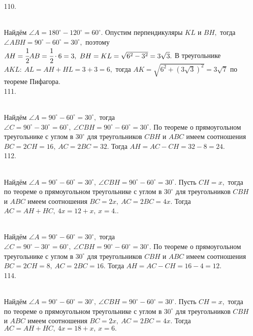 110. \begin{figure}[ht!]
\end{figure}\\
Найдём $\angle A=180^\circ-120^\circ=60^\circ.$ Опустим перпендикуляры $KL$ и $BH,$ тогда $\angle ABH=90^\circ-60^\circ=30^\circ,$ поэтому $AH=\cfrac{1}{2}AB=\cfrac{1}{2}\cdot6=3,\ BH=KL=\sqrt{6^2-3^2}=3\sqrt{3}.$ В треугольнике $AKL:\ AL=AH+HL=3+3=6,$ тогда $AK=\sqrt{6^2+(3\sqrt{3})^2}=3\sqrt{7}$ по теореме Пифагора.\\
111. \begin{figure}[ht!]
\end{figure}\\
Найдём $\angle A=90^\circ-60^\circ=30^\circ,$ тогда $\angle C=90^\circ-30^\circ=60^\circ,\ \angle CBH=90^\circ-60^\circ=30^\circ.$ По теореме о прямоугольном треугольнике с углом в $30^\circ$ для треугольников $CBH$ и $ABC$ имеем соотношения $BC=2CH=16,\ AC=2BC=32.$ Тогда $AH=AC-CH=32-8=24.$\\
112. \begin{figure}[ht!]
\end{figure}\\
Найдём $\angle A=90^\circ-60^\circ=30^\circ,\ \angle CBH=90^\circ-60^\circ=30^\circ.$ Пусть $CH=x,$ тогда по теореме о прямоугольном треугольнике с углом в $30^\circ$ для треугольников $CBH$ и $ABC$ имеем соотношения $BC=2x,\ AC=2BC=4x.$ Тогда $AC=AH+HC,\ 4x=12+x,\ x=4.$\newpage{}. \begin{figure}[ht!]
\end{figure}\\
Найдём $\angle A=90^\circ-60^\circ=30^\circ,$ тогда $\angle C=90^\circ-30^\circ=60^\circ,\ \angle CBH=90^\circ-60^\circ=30^\circ.$ По теореме о прямоугольном треугольнике с углом в $30^\circ$ для треугольников $CBH$ и $ABC$ имеем соотношения $BC=2CH=8,\ AC=2BC=16.$ Тогда $AH=AC-CH=16-4=12.$\\
114. \begin{figure}[ht!]
\end{figure}\\
Найдём $\angle A=90^\circ-60^\circ=30^\circ,\ \angle CBH=90^\circ-60^\circ=30^\circ.$ Пусть $CH=x,$ тогда по теореме о прямоугольном треугольнике с углом в $30^\circ$ для треугольников $CBH$ и $ABC$ имеем соотношения $BC=2x,\ AC=2BC=4x.$ Тогда $AC=AH+HC,\ 4x=18+x,\ x=6.$\\
